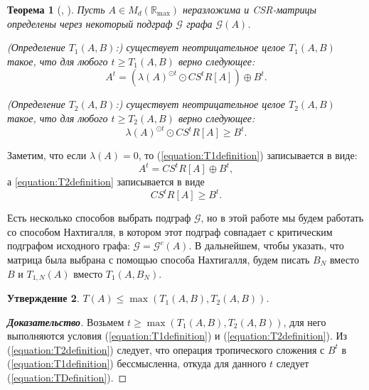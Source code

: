 \documentclass[12pt]{article}
\newtheorem{theorem}{Теорема}[section]
\newtheorem{proposition}[theorem]{Утверждение}
\begin{document}
\begin{theorem}[\cite{bounds}, \cite{15WeakCSRExpantion}]
\label{theorem:weakCSRexpantionTheorem}
Пусть $A \in M_d(\mathbb{R}_{\max})$ неразложима и CSR-матрицы определены через некоторый подграф $\mathcal{G}$ графа $\mathcal{G}(A)$.

(Определение $T_1(A, B)$:) существует неотрицательное целое $T_1(A, B)$  такое, что для любого $t \ge T_1(A, B)$ верно следующее:
\begin{equation}
\label{equation:T1definition}
    A^t = (\lambda(A)^{\odot t} \odot CS^tR[A]) \oplus B^t.
\end{equation}

(Определение $T_2(A, B)$:) существует неотрицательное целое $T_2(A, B)$ такое, что для любого $t \ge T_2(A, B)$ верно следующее:
\begin{equation}
\label{equation:T2definition}
    \lambda(A)^{\odot t} \odot CS^tR[A] \ge B^t.
\end{equation}

\end{theorem}

Заметим, что если $\lambda(A) = 0$, то (\ref{equation:T1definition}) записывается в виде:
\begin{equation}
     A^t = CS^tR[A] \oplus B^t,
\end{equation}
а \ref{equation:T2definition} записывается в виде
\begin{equation}
    CS^tR[A] \ge B^t.
\end{equation}

Есть несколько способов выбрать подграф $\mathcal{G}$, но в этой работе мы будем работать со способом Нахтигалля, в котором этот подграф совпадает с критическим подграфом исходного графа: $\mathcal{G} = \mathcal{G}^c(A)$. В дальнейшем, чтобы указать, что матрица была выбрана с помощью способа Нахтигалля, будем писать $B_N$ вместо $B$ и $T_{1, N}(A)$ вместо $T_1(A, B_N)$.

\begin{proposition}
$T(A) \le \max(T_1(A, B), T_2(A, B))$.
\end{proposition}
\begin{proof}[\textbf{Доказательство}] Возьмем $t \ge \max(T_1(A, B), T_2(A, B))$, для него выполняются условия (\ref{equation:T1definition}) и (\ref{equation:T2definition}). Из (\ref{equation:T2definition}) следует, что операция тропического сложения с $B^t$ в (\ref{equation:T1definition}) бессмысленна, откуда для данного $t$ следует (\ref{equation:TDefinition}).
\end{proof}
\end{document}
